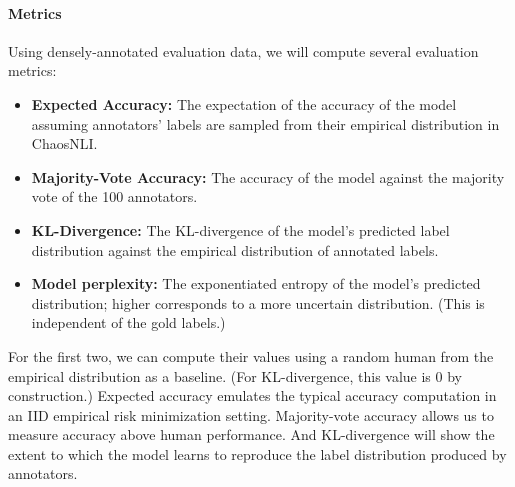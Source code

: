 \documentclass[10pt,a4paper]{article}
\begin{document}
\paragraph{Metrics}
Using densely-annotated evaluation data, we will compute several evaluation metrics:
\begin{itemize}
    \item \textbf{Expected Accuracy:} The expectation of the accuracy of the model assuming annotators' labels are sampled from their empirical distribution in ChaosNLI.
    \item \textbf{Majority-Vote Accuracy:} The accuracy of the model against the majority vote of the 100 annotators.
    \item \textbf{KL-Divergence:} The KL-divergence of the model's predicted label distribution against the empirical distribution of annotated labels.
    \item \textbf{Model perplexity:} The exponentiated entropy of the model's predicted distribution; higher corresponds to a more uncertain distribution. (This is independent of the gold labels.)
\end{itemize}
For the first two, we can compute their values using a random human from the empirical distribution as a baseline. (For KL-divergence, this value is 0 by construction.)
Expected accuracy emulates the typical accuracy computation in an IID empirical risk minimization setting. Majority-vote accuracy allows us to measure accuracy above human performance. And KL-divergence will show the extent to which the model learns to reproduce the label distribution produced by annotators.
\end{document}
